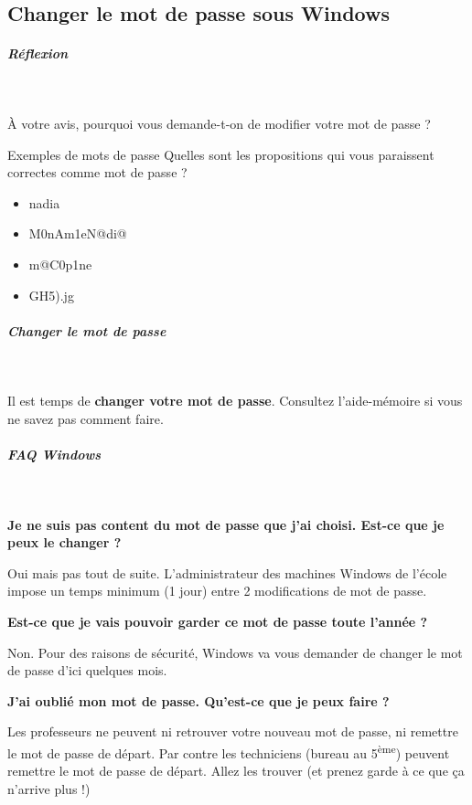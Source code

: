 \documentclass[a4paper,11pt]{article}
\begin{document}
\subsection{Changer le mot de passe sous Windows}


\subparagraph{Réflexion}
\textcolor{white}{.} 
\par
				
\`A votre avis, pourquoi vous demande-t-on de modifier votre mot de passe ?
				
\par
			
\begin{Exercice}{Exemples de mots de passe} 		
Quelles sont les propositions qui vous paraissent correctes comme mot de passe ?
\begin{itemize} 
  \item[ \ding{"6F} ] nadia
  \item[ \ding{"6F} ] M0nAm1eN@di@
  \item[ \ding{"6F} ] m@C0p1ne
  \item[ \ding{"6F} ] GH5).jg
 \end{itemize} 
\end{Exercice} 
 
\subparagraph{Changer le mot de passe} 
		
\textcolor{white}{.} 
\par
				
\par
        
Il est  temps de \textbf{changer votre mot de passe}. Consultez l'aide-m\'emoire si vous ne savez pas comment faire. 
				
\par
        
			
\subparagraph{FAQ Windows} 
		
\textcolor{white}{.} \par
				
 \par
 \textbf{Je ne suis pas content du mot de passe que j'ai choisi. Est-ce que je peux le changer ?}
 \par
Oui mais pas tout de suite. L'administrateur des machines Windows de l'\'ecole impose un temps minimum (1 jour) entre 2 modifications de mot de passe.
 \par
 \textbf{Est-ce que je vais pouvoir garder ce mot de passe toute l'ann\'ee ?}
\par
Non. Pour des raisons de s\'ecurit\'e, Windows va vous demander de changer le mot de passe d'ici quelques mois.
\par
 \textbf{J'ai oubli\'e mon mot de passe. Qu'est-ce que je peux faire ?}
 \par
 Les professeurs ne peuvent ni retrouver votre nouveau mot de passe, ni remettre le mot de passe de d\'epart. Par contre les techniciens (bureau au 5\textsuperscript{\`eme}) peuvent remettre le mot de passe de d\'epart. Allez les trouver (et prenez garde \`a ce que \c ca n'arrive plus !)
 \par
\end{document}
